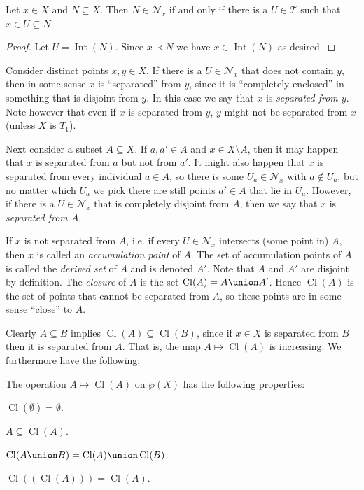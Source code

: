 \documentclass[article, a4paper, 11pt, oneside]{memoir}
\numberwithin{equation}{chapter}
\newcommand{\calT}{\mathcal{T}}
\newcommand{\inpoint}{\prec}
\newcommand{\calN}{\mathcal{N}}
\newcommand{\nhoods}[1]{\calN_{#1}}
\renewcommand{\powerset}[1]{\wp(#1)}
\renewcommand{\interior}[1]{\operatorname{Int}(#1)}
\renewcommand{\closure}[1]{\operatorname{Cl}(#1)}
\begin{document}
\begin{lemma}
    Let $x \in X$ and $N \subseteq X$. Then $N \in \nhoods{x}$ if and only if there is a $U \in \calT$ such that $x \in U \subseteq N$.
\end{lemma}

\begin{proof}
    Let $U = \interior{N}$. Since $x \inpoint N$ we have $x \in \interior{N}$ as desired.
\end{proof}

Consider distinct points $x,y \in X$. If there is a $U \in \nhoods{x}$ that does not contain $y$, then in some sense $x$ is \enquote{separated} from $y$, since it is \enquote{completely enclosed} in something that is disjoint from $y$. In this case we say that $x$ is \emph{separated from $y$}. Note however that even if $x$ is separated from $y$, $y$ might not be separated from $x$ (unless $X$ is $T_1$).

Next consider a subset $A \subseteq X$. If $a,a' \in A$ and $x \in X \setminus A$, then it may happen that $x$ is separated from $a$ but not from $a'$. It might also happen that $x$ is separated from every individual $a \in A$, so there is some $U_a \in \nhoods{x}$ with $a \not\in U_a$, but no matter which $U_a$ we pick there are still points $a' \in A$ that lie in $U_a$. However, if there is a $U \in \nhoods{x}$ that is completely disjoint from $A$, then we say that $x$ is \emph{separated from $A$}.

If $x$ is not separated from $A$, i.e. if every $U \in \nhoods{x}$ intersects (some point in) $A$, then $x$ is called an \emph{accumulation point} of $A$. The set of accumulation points of $A$ is called the \emph{derived set} of $A$ and is denoted $A'$. Note that $A$ and $A'$ are disjoint by definition. The \emph{closure} of $A$ is the set $\closure{A} = A \union A'$. Hence $\closure{A}$ is the set of points that cannot be separated from $A$, so these points are in some sense \enquote{close} to $A$.

Clearly $A \subseteq B$ implies $\closure{A} \subseteq \closure{B}$, since if $x \in X$ is separated from $B$ then it is separated from $A$. That is, the map $A \mapsto \closure{A}$ is increasing. We furthermore have the following:

\begin{proposition}
    The operation $A \mapsto \closure{A}$ on $\powerset{X}$ has the following properties:
    \begin{enumprop}
        \item $\closure{\emptyset} = \emptyset$.
        \item $A \subseteq \closure{A}$.
        \item $\closure{A \union B} = \closure{A} \union \closure{B}$.
        \item $\closure{(\closure{A})} = \closure{A}$.
    \end{enumprop}
\end{proposition}
\end{document}
